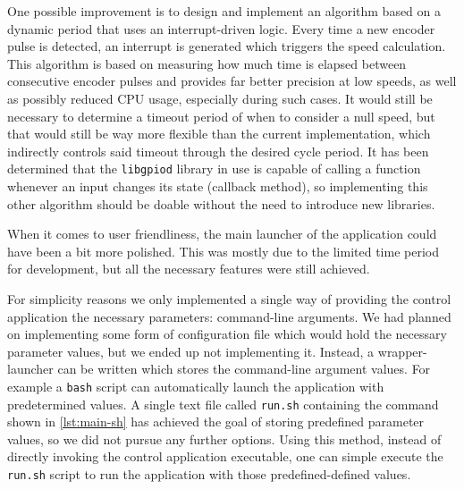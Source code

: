 One possible improvement is to design and implement an algorithm based on a dynamic period that uses an interrupt-driven logic.
Every time a new encoder pulse is detected, an interrupt is generated which triggers the speed calculation.
This algorithm is based on measuring how much time is elapsed between consecutive encoder pulses and provides far better precision at low speeds, as well as possibly reduced CPU usage, especially during such cases.
It would still be necessary to determine a timeout period of when to consider a null speed, but that would still be way more flexible than the current implementation, which indirectly controls said timeout through the desired cycle period.
It has been determined that the \verb|libgpiod| library in use is capable of calling a function whenever an input changes its state (callback method), so implementing this other algorithm should be doable without the need to introduce new libraries.

When it comes to user friendliness, the main launcher of the application could have been a bit more polished.
This was mostly due to the limited time period for development, but all the necessary features were still achieved.

For simplicity reasons we only implemented a single way of providing the control application the necessary parameters: command-line arguments.
We had planned on implementing some form of configuration file which would hold the necessary parameter values, but we ended up not implementing it.
Instead, a wrapper-launcher can be written which stores the command-line argument values. For example a \verb|bash| script can automatically launch the application with predetermined values.
A single text file called \verb|run.sh| containing the command shown in \autoref{lst:main-sh} has achieved the goal of storing predefined parameter values, so we did not pursue any further options.
Using this method, instead of directly invoking the control application executable, one can simple execute the \verb|run.sh| script to run the application with those predefined-defined values.


